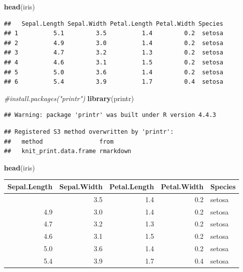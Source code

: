 \documentclass[
]{article}
\newenvironment{Shaded}{\begin{snugshade}}{\end{snugshade}}
\newcommand{\CommentTok}[1]{\textcolor[rgb]{0.56,0.35,0.01}{\textit{#1}}}
\newcommand{\FunctionTok}[1]{\textcolor[rgb]{0.13,0.29,0.53}{\textbf{#1}}}
\newcommand{\NormalTok}[1]{#1}
\begin{document}
\begin{Shaded}
\begin{Highlighting}[]
\FunctionTok{head}\NormalTok{(iris)}
\end{Highlighting}
\end{Shaded}

\begin{verbatim}
##   Sepal.Length Sepal.Width Petal.Length Petal.Width Species
## 1          5.1         3.5          1.4         0.2  setosa
## 2          4.9         3.0          1.4         0.2  setosa
## 3          4.7         3.2          1.3         0.2  setosa
## 4          4.6         3.1          1.5         0.2  setosa
## 5          5.0         3.6          1.4         0.2  setosa
## 6          5.4         3.9          1.7         0.4  setosa
\end{verbatim}

\begin{Shaded}
\begin{Highlighting}[]
\CommentTok{\#install.packages("printr")}
\FunctionTok{library}\NormalTok{(printr)}
\end{Highlighting}
\end{Shaded}

\begin{verbatim}
## Warning: package 'printr' was built under R version 4.4.3
\end{verbatim}

\begin{verbatim}
## Registered S3 method overwritten by 'printr':
##   method                from     
##   knit_print.data.frame rmarkdown
\end{verbatim}

\begin{Shaded}
\begin{Highlighting}[]
\FunctionTok{head}\NormalTok{(iris)}
\end{Highlighting}
\end{Shaded}

\begin{longtable}[]{@{}rrrrl@{}}
\toprule\noalign{}
Sepal.Length & Sepal.Width & Petal.Length & Petal.Width & Species \\
\midrule\noalign{}
\endhead
\bottomrule\noalign{}
\endlastfoot
5.1 & 3.5 & 1.4 & 0.2 & setosa \\
4.9 & 3.0 & 1.4 & 0.2 & setosa \\
4.7 & 3.2 & 1.3 & 0.2 & setosa \\
4.6 & 3.1 & 1.5 & 0.2 & setosa \\
5.0 & 3.6 & 1.4 & 0.2 & setosa \\
5.4 & 3.9 & 1.7 & 0.4 & setosa \\
\end{longtable}
\end{document}
